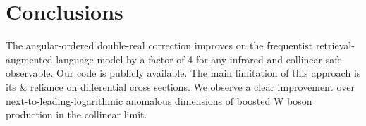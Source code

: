 \section{Conclusions}\label{sec:conclusions}

The angular-ordered double-real correction improves on the frequentist
retrieval-augmented language model by a factor of 4 for any infrared and
collinear safe observable. Our code is publicly available. The main
limitation of this approach is its & reliance on differential cross
sections. We observe a clear improvement over
next-to-leading-logarithmic anomalous dimensions of boosted W boson
production in the collinear limit.

